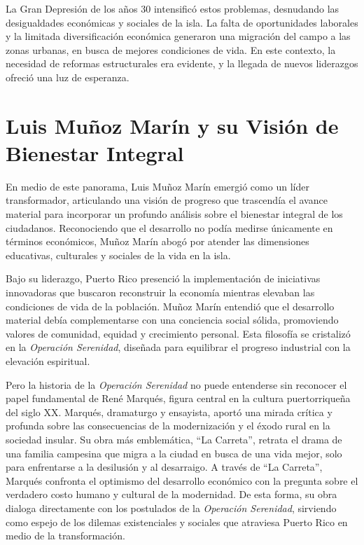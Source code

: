 \documentclass[
]{book}
\begin{document}
La Gran Depresión de los años 30 intensificó estos problemas, desnudando las desigualdades económicas y sociales de la isla. La falta de oportunidades laborales y la limitada diversificación económica generaron una migración del campo a las zonas urbanas, en busca de mejores condiciones de vida. En este contexto, la necesidad de reformas estructurales era evidente, y la llegada de nuevos liderazgos ofreció una luz de esperanza.

\section{Luis Muñoz Marín y su Visión de Bienestar Integral}\label{luis-muuxf1oz-maruxedn-y-su-visiuxf3n-de-bienestar-integral}

En medio de este panorama, Luis Muñoz Marín emergió como un líder transformador, articulando una visión de progreso que trascendía el avance material para incorporar un profundo análisis sobre el bienestar integral de los ciudadanos. Reconociendo que el desarrollo no podía medirse únicamente en términos económicos, Muñoz Marín abogó por atender las dimensiones educativas, culturales y sociales de la vida en la isla.

Bajo su liderazgo, Puerto Rico presenció la implementación de iniciativas innovadoras que buscaron reconstruir la economía mientras elevaban las condiciones de vida de la población. Muñoz Marín entendió que el desarrollo material debía complementarse con una conciencia social sólida, promoviendo valores de comunidad, equidad y crecimiento personal. Esta filosofía se cristalizó en la \emph{Operación Serenidad}, diseñada para equilibrar el progreso industrial con la elevación espiritual.

Pero la historia de la \emph{Operación Serenidad} no puede entenderse sin reconocer el papel fundamental de René Marqués, figura central en la cultura puertorriqueña del siglo XX. Marqués, dramaturgo y ensayista, aportó una mirada crítica y profunda sobre las consecuencias de la modernización y el éxodo rural en la sociedad insular. Su obra más emblemática, ``La Carreta'', retrata el drama de una familia campesina que migra a la ciudad en busca de una vida mejor, solo para enfrentarse a la desilusión y al desarraigo. A través de ``La Carreta'', Marqués confronta el optimismo del desarrollo económico con la pregunta sobre el verdadero costo humano y cultural de la modernidad. De esta forma, su obra dialoga directamente con los postulados de la \emph{Operación Serenidad}, sirviendo como espejo de los dilemas existenciales y sociales que atraviesa Puerto Rico en medio de la transformación.
\end{document}
